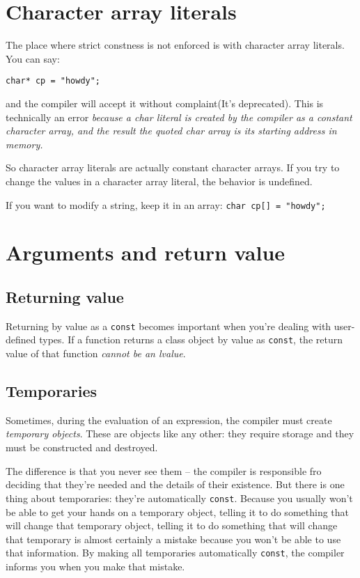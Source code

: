 \documentclass[11pt, a4paper]{book}
\begin{document}
\section{Character array literals}
The place where strict constness is not enforced is with character array
literals. You can say:
\begin{verbatim}
char* cp = "howdy";
\end{verbatim}
and the compiler will accept it without complaint(It's deprecated). This is technically an error
\emph{because a char literal is created by the compiler as a constant character array,
and the result the quoted char array is its starting address in memory.}


So character array literals are actually constant character arrays. If you try
to change the values in a character array literal, the behavior is undefined.

If you want to modify a string, keep it in an array: \verb|char cp[] = "howdy";|

\section{Arguments and return value}
\subsection{Returning value}
Returning by value as a \verb|const| becomes important when you're dealing with
user-defined types. If a function returns a class object by value as
\verb|const|, the return value of that function \emph{cannot be an lvalue}.
\subsection{Temporaries}
Sometimes, during the evaluation of an expression, the compiler must create
\emph{temporary objects}. These are objects like any other: they require storage
and they must be constructed and destroyed.

The difference is that you never see them -- the compiler is responsible fro
deciding that they're needed and the details of their existence. But there is
one thing about temporaries: they're automatically \verb|const|. Because you
usually won't be able to get your hands on a temporary object, telling it to do
something that will change that temporary object, telling it to do something
that will change that temporary is almost certainly a mistake because you won't
be able to use that information. By making all temporaries automatically
\verb|const|, the compiler informs you when you make that mistake.
\end{document}
